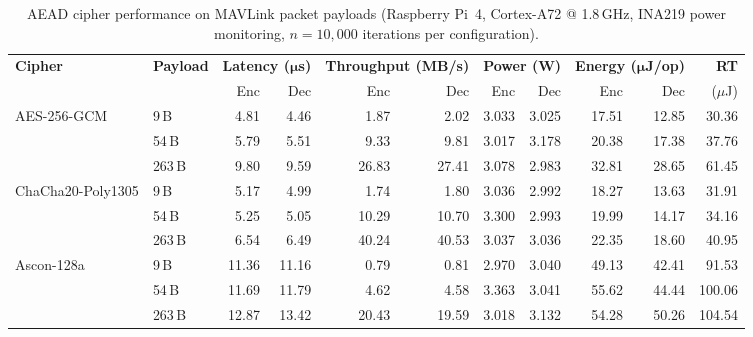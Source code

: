 \begin{table}[!t]
\centering
\footnotesize
\setlength{\tabcolsep}{3.5pt}
\caption{AEAD cipher performance on MAVLink packet payloads
(Raspberry Pi~4, Cortex-A72 @ 1.8\,GHz, INA219 power monitoring,
$n{=}10{,}000$ iterations per configuration).}
\label{tab:aead-benchmark}
\begin{tabular}{@{}llrrrrrrrrr@{}}
\toprule
\textbf{Cipher} & \textbf{Payload} & \multicolumn{2}{c}{\textbf{Latency ($\boldsymbol{\mu}$s)}} & \multicolumn{2}{c}{\textbf{Throughput (MB/s)}} & \multicolumn{2}{c}{\textbf{Power (W)}} & \multicolumn{2}{c}{\textbf{Energy ($\boldsymbol{\mu}$J/op)}} & \textbf{RT} \\
\cmidrule(lr){3-4} \cmidrule(lr){5-6} \cmidrule(lr){7-8} \cmidrule(lr){9-10}
 &  & Enc & Dec & Enc & Dec & Enc & Dec & Enc & Dec & ($\mu$J) \\
\midrule
AES-256-GCM       & 9\,B   &  4.81 &  4.46 &  1.87 &  2.02 & 3.033 & 3.025 & 17.51 & 12.85 &  30.36 \\
                   & 54\,B  &  5.79 &  5.51 &  9.33 &  9.81 & 3.017 & 3.178 & 20.38 & 17.38 &  37.76 \\
                   & 263\,B &  9.80 &  9.59 & 26.83 & 27.41 & 3.078 & 2.983 & 32.81 & 28.65 &  61.45 \\
\midrule
ChaCha20-Poly1305  & 9\,B   &  5.17 &  4.99 &  1.74 &  1.80 & 3.036 & 2.992 & 18.27 & 13.63 &  31.91 \\
                   & 54\,B  &  5.25 &  5.05 & 10.29 & 10.70 & 3.300 & 2.993 & 19.99 & 14.17 &  34.16 \\
                   & 263\,B &  6.54 &  6.49 & 40.24 & 40.53 & 3.037 & 3.036 & 22.35 & 18.60 &  40.95 \\
\midrule
Ascon-128a         & 9\,B   & 11.36 & 11.16 &  0.79 &  0.81 & 2.970 & 3.040 & 49.13 & 42.41 &  91.53 \\
                   & 54\,B  & 11.69 & 11.79 &  4.62 &  4.58 & 3.363 & 3.041 & 55.62 & 44.44 & 100.06 \\
                   & 263\,B & 12.87 & 13.42 & 20.43 & 19.59 & 3.018 & 3.132 & 54.28 & 50.26 & 104.54 \\
\bottomrule
\end{tabular}
\end{table}

